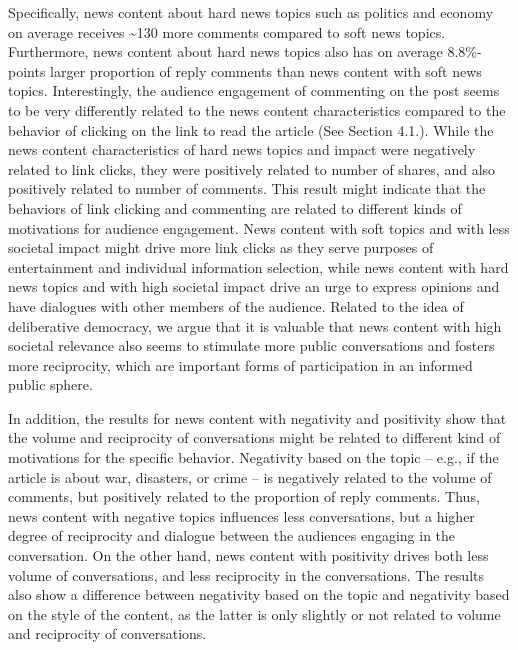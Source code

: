 \documentclass[
]{article}
\begin{document}
Specifically, news content about hard news topics such as politics and
economy on average receives \textasciitilde130 more comments compared to
soft news topics. Furthermore, news content about hard news topics also
has on average 8.8\%-points larger proportion of reply comments than
news content with soft news topics. Interestingly, the audience
engagement of commenting on the post seems to be very differently
related to the news content characteristics compared to the behavior of
clicking on the link to read the article (See Section 4.1.). While the
news content characteristics of hard news topics and impact were
negatively related to link clicks, they were positively related to
number of shares, and also positively related to number of comments.
This result might indicate that the behaviors of link clicking and
commenting are related to different kinds of motivations for audience
engagement. News content with soft topics and with less societal impact
might drive more link clicks as they serve purposes of entertainment and
individual information selection, while news content with hard news
topics and with high societal impact drive an urge to express opinions
and have dialogues with other members of the audience. Related to the
idea of deliberative democracy, we argue that it is valuable that news
content with high societal relevance also seems to stimulate more public
conversations and fosters more reciprocity, which are important forms of
participation in an informed public sphere.

In addition, the results for news content with negativity and positivity
show that the volume and reciprocity of conversations might be related
to different kind of motivations for the specific behavior. Negativity
based on the topic -- e.g., if the article is about war, disasters, or
crime -- is negatively related to the volume of comments, but positively
related to the proportion of reply comments. Thus, news content with
negative topics influences less conversations, but a higher degree of
reciprocity and dialogue between the audiences engaging in the
conversation. On the other hand, news content with positivity drives
both less volume of conversations, and less reciprocity in the
conversations. The results also show a difference between negativity
based on the topic and negativity based on the style of the content, as
the latter is only slightly or not related to volume and reciprocity of
conversations.
\end{document}
